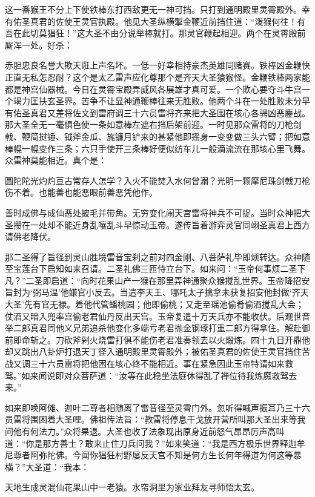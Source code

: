 \documentclass[12pt,UTF8]{ctexbook}
\begin{document}
{这一番猴王不分上下使铁棒东打西敌更无一神可挡。只打到通明殿里灵霄殿外。幸有佑圣真君的佐使王灵官执殿。他见大圣纵横掣金鞭近前挡住道：“泼猴何往！有吾在此切莫猖狂！”这大圣不由分说举棒就打。那灵官鞭起相迎。两个在灵霄殿前厮浑一处。好杀：

赤胆忠良名誉大欺天诳上声名坏。一低一好幸相持豪杰英雄同赌赛。铁棒凶金鞭快正直无私怎忍耐？这个是太乙雷声应化尊那个是齐天大圣猿猴怪。金鞭铁棒两家能都是神宫仙器械。今日在灵霄宝殿弄威风各展雄才真可爱。一个欺心要夺斗牛宫一个竭力匡扶玄圣界。苦争不让显神通鞭棒往来无胜败。他两个斗在一处胜败未分早有佑圣真君又差将佐文到雷府调三十六员雷将齐来把大圣围在垓心各骋凶恶鏖战。那大圣全无一毫惧色使一条如意棒左遮右挡后架前迎。一时见那众雷将的刀枪剑戟、鞭简挝锤、钺斧金瓜、旄镰月铲来的甚紧他即摇身一变变做三头六臂；把如意棒幌一幌变作三条；六只手使开三条棒好便似纺车儿一般滴流流在那垓心里飞舞。众雷神莫能相近。真个是：

圆陀陀光灼灼亘古常存人怎学？入火不能焚入水何曾溺？光明一颗摩尼珠剑戟刀枪伤不着。也能善也能恶眼前善恶凭他作。

善时成佛与成仙恶处披毛并带角。无穷变化闹天宫雷将神兵不可捉。当时众神把大圣攒在一处却不能近身乱嚷乱斗早惊动玉帝。遂传旨着游弈灵官同翊圣真君上西方请佛老降伏。

那二圣得了旨径到灵山胜境雷音宝刹之前对四金刚、八菩萨礼毕即烦转达。众神随至宝莲台下启知如来召请。二圣礼佛三匝侍立台下。如来问：“玉帝何事烦二圣下凡？”二圣即启道：“向时花果山产一猴在那里弄神通聚众猴搅乱世界。玉帝降招安旨封为‘弼马温’他嫌官小反去。当遣李天王、哪吒太子擒拿未获复招安他封做‘齐天大圣’先有官无禄。着他代管蟠桃园；他即偷桃；又走至瑶池偷肴偷酒搅乱大会；仗酒又暗入兜率宫偷老君仙丹反出天宫。玉帝复遣十万天兵亦不能收伏。后观世音举二郎真君同他义兄弟追杀他变化多端亏老君抛金钢琢打重二郎方得拿住。解赴御前即命斩之。刀砍斧剁火烧雷打俱不能伤老君准奏领去以火煅炼。四十九日开鼎他却又跳出八卦炉打退天丁径入通明殿里灵霄殿外；被佑圣真君的佐使王灵官挡住苦战又调三十六员雷将把他困在垓心终不能相近。事在紧急因此玉帝特请如来救驾。”如来闻说即对众菩萨道：“汝等在此稳坐法庭休得乱了禅位待我炼魔救驾去来。”

如来即唤阿傩、迦叶二尊者相随离了雷音径至灵霄门外。忽听得喊声振耳乃三十六员雷将围困着大圣哩。佛祖传法旨：“教雷将停息干戈放开营所叫那大圣出来等我问他有何法力。”众将果退。大圣也收了法象现出原身近前怒气昂昂厉声高叫道：“你是那方善士？敢来止住刀兵问我？”如来笑道：“我是西方极乐世界释迦牟尼尊者阿弥陀佛。今闻你猖狂村野屡反天宫不知是何方生长何年得道为何这等暴横？”大圣道：“我本：

天地生成灵混仙花果山中一老猿。水帘洞里为家业拜友寻师悟太玄。

}
\end{document}
